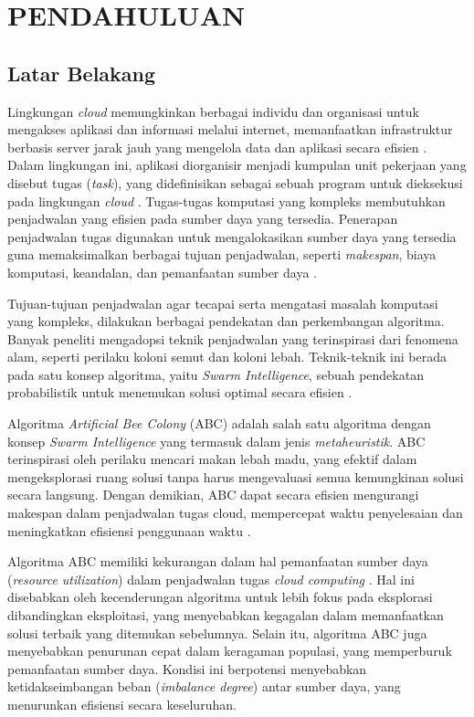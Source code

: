 \chapter{PENDAHULUAN}

\section{Latar Belakang}
Lingkungan \textit{cloud} memungkinkan berbagai individu dan organisasi untuk mengakses aplikasi dan informasi melalui internet, memanfaatkan infrastruktur berbasis server jarak jauh yang mengelola data dan aplikasi secara efisien \parencite{Younus2025}. Dalam lingkungan ini, aplikasi diorganisir menjadi kumpulan unit pekerjaan yang disebut tugas (\textit{task}), yang didefinisikan sebagai sebuah program untuk dieksekusi pada lingkungan \textit{cloud} \parencite{Buyya2013}. Tugas-tugas komputasi yang kompleks membutuhkan penjadwalan yang efisien pada sumber daya yang tersedia. Penerapan penjadwalan tugas digunakan untuk mengalokasikan sumber daya yang tersedia guna memaksimalkan berbagai tujuan penjadwalan, seperti \textit{makespan}, biaya komputasi, keandalan, dan pemanfaatan sumber daya \parencite{Prity2023}.

Tujuan-tujuan penjadwalan agar tecapai serta mengatasi masalah komputasi yang kompleks, dilakukan berbagai pendekatan dan perkembangan algoritma. Banyak peneliti mengadopsi teknik penjadwalan yang terinspirasi dari fenomena alam, seperti perilaku koloni semut dan koloni lebah. Teknik-teknik ini berada pada satu konsep algoritma, yaitu \textit{Swarm Intelligence}, sebuah pendekatan probabilistik untuk menemukan solusi optimal secara efisien \parencite{Deepa2016}.

Algoritma \textit{Artificial Bee Colony} (ABC) adalah salah satu algoritma dengan konsep \textit{Swarm Intelligence} yang termasuk dalam jenis \textit{metaheuristik}. ABC terinspirasi oleh perilaku mencari makan lebah madu, yang efektif dalam mengeksplorasi ruang solusi tanpa harus mengevaluasi semua kemungkinan solusi secara langsung. Dengan demikian, ABC dapat secara efisien mengurangi makespan dalam penjadwalan tugas cloud, mempercepat waktu penyelesaian dan meningkatkan efisiensi penggunaan waktu \parencite{Tawfeek2015}.

Algoritma ABC memiliki kekurangan dalam hal pemanfaatan sumber daya (\textit{resource utilization}) dalam penjadwalan tugas \textit{cloud computing} \parencite{Li2024}. Hal ini disebabkan oleh kecenderungan algoritma untuk lebih fokus pada eksplorasi dibandingkan eksploitasi, yang menyebabkan kegagalan dalam memanfaatkan solusi terbaik yang ditemukan sebelumnya. Selain itu, algoritma ABC juga menyebabkan penurunan cepat dalam keragaman populasi, yang memperburuk pemanfaatan sumber daya. Kondisi ini berpotensi menyebabkan ketidakseimbangan beban (\textit{imbalance degree}) antar sumber daya, yang menurunkan efisiensi secara keseluruhan.

